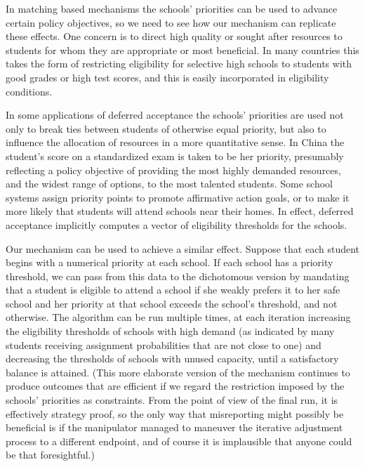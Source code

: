 \documentclass[12pt]{article}
\theoremstyle{definition}
\begin{document}
In matching based mechanisms the schools' priorities can be used to advance certain policy objectives, so we need to see how our mechanism can replicate these effects.  One concern is to direct high quality or sought after resources to students for whom they are appropriate or most beneficial.  In many countries this takes the form of restricting eligibility for selective high schools to students with good grades or high test scores, and this is easily incorporated in eligibility conditions. 

In some applications of deferred acceptance the schools' priorities are used not only to break ties between students of otherwise equal priority, but also to influence the allocation of resources in a more quantitative sense.
In China \citep{WaZh20} the student's score on a standardized exam is taken to be her priority, presumably reflecting a policy objective of providing the most highly demanded resources, and the widest range of options, to the most talented students.  Some school systems assign priority points to promote affirmative action goals, or to make it more likely that students will attend schools near their homes.  In effect, deferred acceptance implicitly computes a vector of eligibility thresholds for the schools.

Our mechanism can be used to achieve a similar effect.  Suppose that each student begins with a numerical priority at each school.  If each school has a priority threshold, we can pass from this data to the dichotomous version by mandating that a student is eligible to attend a school if she weakly prefers it to her safe school and her priority at that school exceeds the school's threshold, and not otherwise.  The algorithm can be run multiple times, at each iteration increasing the eligibility thresholds of schools with high demand (as indicated by many students receiving assignment probabilities that are not close to one) and decreasing the thresholds of schools with unused capacity, until a satisfactory balance is attained.  (This more elaborate version of the mechanism continues to produce outcomes that are efficient if we regard the restriction imposed by the schools' priorities as constraints.  From the point of view of the final run, it is effectively strategy proof, so the only way that misreporting might possibly be beneficial is if the manipulator managed to maneuver the iterative adjustment process to a different endpoint, and of course it is implausible that anyone could be that foresightful.)
\end{document}
